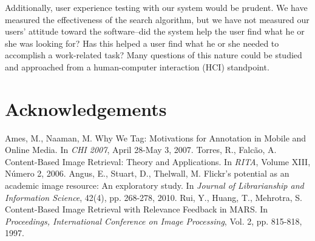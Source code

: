 \documentclass{article}
\begin{document}
Additionally, user experience testing with our system would be prudent.  We have measured the effectiveness of the
search algorithm, but we have not measured our users' attitude toward the software--did the system help the user
find what he or she was looking for?  Has this helped a user find what he or she needed to accomplish a work-related
task?  Many questions of this nature could be studied and approached from a human-computer interaction (HCI) standpoint.


\section{Acknowledgements}


\begin{thebibliography}{99}
   Ames, M., Naaman, M.  Why We Tag: Motivations for Annotation in Mobile and Online Media.  In
    {\em CHI 2007}, April 28-May 3, 2007.
   Torres, R., Falc\~ao, A.  Content-Based Image Retrieval: Theory and Applications.  In
    {\em RITA}, Volume XIII, N\'umero 2, 2006.
   Angus, E., Stuart, D., Thelwall, M.  Flickr's potential as an academic image resource: An
    exploratory study.  In {\em Journal of Librarianship and Information Science}, 42(4), pp. 268-278, 2010.
   Rui, Y., Huang, T., Mehrotra, S.  Content-Based Image Retrieval with Relevance Feedback in MARS.  
    In {\em Proceedings, International Conference on Image Processing}, Vol. 2, pp. 815-818, 1997.
\end{thebibliography}
\end{document}
